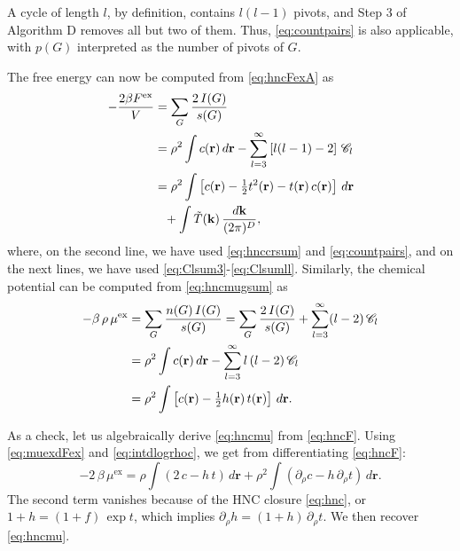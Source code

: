 \documentclass[preprint]{revtex4-1}
\newcommand{\vct}[1]{\mathbf{#1}}
\providecommand{\vr}{} %
\renewcommand{\vr}{\vct{r}}
\newcommand{\vk}{\vct{k}}
\newcommand{\dvk}{\frac{d\vk}{(2\pi)^D}}
\newcommand{\supex}[1]{ { { #1 }^{ \mathrm{ex} } } }
\newcommand{\Fex}{\supex{F}}
\newcommand{\muex}{\supex{\mu}}
\newcommand{\Chn}{\mathscr{C}}
\newcommand{\A}{\mathcal{A}}
\begin{document}
A cycle of length $l$, by definition,
  contains $l (l - 1)$ pivots,
  and Step 3 of Algorithm D
  removes all but two of them.
%
Thus, \eqref{eq:countpairs}
  is also applicable, with $p(G)$ interpreted
  as the number of pivots of $G$.



The free energy can now be computed from \eqref{eq:hncFexA}
as\cite{morita1958, *morita1959, *morita1960, singer1985}
%
\begin{align}
    - \frac{ 2 \beta \Fex } { V }
  &=
      \sum_G \frac{ 2 \, I(G) } { s(G) }
      \notag \\
  &=
      \rho^2 \int c(\vr) \, d\vr
    - \sum_{l = 3}^\infty \left[ l(l-1) - 2 \right] \, \Chn_l
      \notag \\
  &=
      \rho^2 \int \left[ c(\vr) - \tfrac{1}{2} t^2(\vr) - t(\vr) \, c(\vr) \right] \, d\vr
      \notag \\
  & \hphantom{=}
      + \int  \tilde{T}(\vk) \, \dvk,
\label{eq:hncF}
\end{align}
%
where,
  on the second line,
  we have used \eqref{eq:hnccrsum} and \eqref{eq:countpairs},
  and on the next lines,
  we have used \eqref{eq:Clsum3}-\eqref{eq:Clsumll}.
%
Similarly, the chemical potential
  can be computed from \eqref{eq:hncmugsum}
  as \cite{morita1958, *morita1959, *morita1960, singer1985}
%
\begin{align}
    - \beta \, \rho \, \muex
  &=
      \sum_G \frac{ n(G) \, I(G) } { s(G) }
  =
      \sum_G \frac{ 2 \, I(G) } { s(G) }
    + \sum_{l = 3}^\infty (l-2) \, \Chn_l
      \notag \\
  &=
      \rho^2 \int c(\vr) \, d\vr
    - \sum_{l = 3}^\infty l \, (l-2) \, \Chn_l
      \notag \\
  &=
      \rho^2 \int \left[ c(\vr) - \tfrac{1}{2} h(\vr) \, t(\vr) \right] \, d\vr.
\label{eq:hncmu}
\end{align}
%


As a check, let us algebraically derive \eqref{eq:hncmu} from \eqref{eq:hncF}.
%
Using \eqref{eq:muexdFex} and \eqref{eq:intdlogrhoc},
we get from differentiating \eqref{eq:hncF}:
\[
  -2 \, \beta \, \muex = \rho \int (2\,c - h \, t) \, d\vr
  + \rho^2 \int (\partial_\rho c - h \, \partial_\rho t) \, d\vr.
\]
The second term vanishes because of the HNC closure \eqref{eq:hnc},
or
$1+h = (1+f) \, \exp t$,
%
  which implies $\partial_\rho h = (1+ h) \, \partial_\rho t$.
%
We then recover \eqref{eq:hncmu}.
\end{document}
